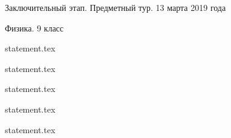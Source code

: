 \documentclass[a4paper,11pt, oneside]{book}
\begin{document}
\vspace{-3mm}
\vspace{-5mm}
\vspace{-5mm}

\normalsize

\begin{center}
    Заключительный этап. Предметный тур. 13 марта 2019 года
    
    Физика. 9 класс
\end{center}

\parindent=0cm

{statement.tex}

{statement.tex}

{statement.tex}

\newpage

{statement.tex}

{statement.tex}
\end{document}
